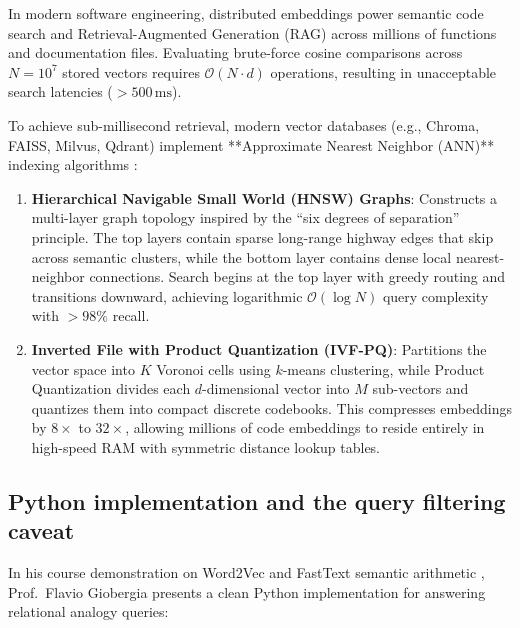 \documentclass[../../main.tex]{subfiles}
\begin{document}
In modern software engineering, distributed embeddings power semantic code search and Retrieval-Augmented Generation (RAG) across millions of functions and documentation files. Evaluating brute-force cosine comparisons across $N = 10^7$ stored vectors requires $\mathcal{O}(N \cdot d)$ operations, resulting in unacceptable search latencies ($>500\,\text{ms}$).

To achieve sub-millisecond retrieval, modern vector databases (e.g., Chroma, FAISS, Milvus, Qdrant) implement **Approximate Nearest Neighbor (ANN)** indexing algorithms \cite{enkk2023embeddings}:
\begin{enumerate}
    \item \textbf{Hierarchical Navigable Small World (HNSW) Graphs}: Constructs a multi-layer graph topology inspired by the ``six degrees of separation'' principle. The top layers contain sparse long-range highway edges that skip across semantic clusters, while the bottom layer contains dense local nearest-neighbor connections. Search begins at the top layer with greedy routing and transitions downward, achieving logarithmic $\mathcal{O}(\log N)$ query complexity with $>98\%$ recall.
    \item \textbf{Inverted File with Product Quantization (IVF-PQ)}: Partitions the vector space into $K$ Voronoi cells using $k$-means clustering, while Product Quantization divides each $d$-dimensional vector into $M$ sub-vectors and quantizes them into compact discrete codebooks. This compresses embeddings by $8\times$ to $32\times$, allowing millions of code embeddings to reside entirely in high-speed RAM with symmetric distance lookup tables.
\end{enumerate}

\subsection{Python implementation and the query filtering caveat}
\label{subsec:python_gist}

In his course demonstration on Word2Vec and FastText semantic arithmetic \cite{giobergia2024gist}, Prof.~Flavio Giobergia presents a clean Python implementation for answering relational analogy queries:
\end{document}
